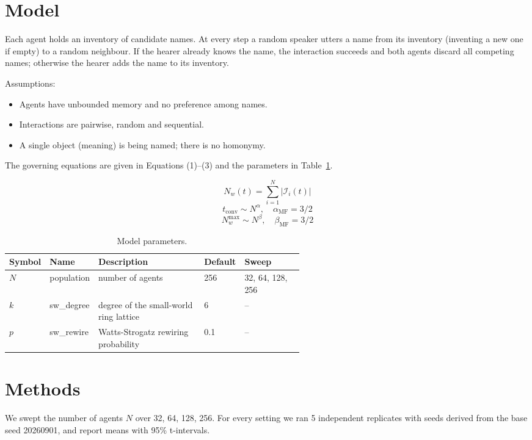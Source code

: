 \documentclass[11pt,a4paper]{article}
\begin{document}
\section{Model}
Each agent holds an inventory of candidate names. At every step a random speaker utters a name from its inventory (inventing a new one if empty) to a random neighbour. If the hearer already knows the name, the interaction succeeds and both agents discard all competing names; otherwise the hearer adds the name to its inventory.

Assumptions:
\begin{itemize}
  \item Agents have unbounded memory and no preference among names.
  \item Interactions are pairwise, random and sequential.
  \item A single object (meaning) is being named; there is no homonymy.
\end{itemize}

The governing equations are given in Equations (1)--(3) and the parameters in Table~\ref{tab:params}.

\begin{equation}\label{eq:1}
N_w(t) = \sum_{i=1}^{N} |\mathcal{I}_i(t)|
\end{equation}
\begin{equation}\label{eq:2}
t_{\mathrm{conv}} \sim N^{\alpha}, \quad \alpha_{\mathrm{MF}} = 3/2
\end{equation}
\begin{equation}\label{eq:3}
N_w^{\max} \sim N^{\beta}, \quad \beta_{\mathrm{MF}} = 3/2
\end{equation}
\begin{table}[ht]
\centering\small
\caption{Model parameters.}\label{tab:params}
\begin{tabular}{l l p{0.36\linewidth} l p{0.2\linewidth}}
\toprule
Symbol & Name & Description & Default & Sweep\\
\midrule
$N$ & population & number of agents & 256 & 32, 64, 128, 256\\
$k$ & sw\_degree & degree of the small-world ring lattice & 6 & --\\
$p$ & sw\_rewire & Watts-Strogatz rewiring probability & 0.1 & --\\
\bottomrule
\end{tabular}
\end{table}
\section{Methods}
We swept the number of agents $N$ over 32, 64, 128, 256. For every setting we ran 5 independent replicates with seeds derived from the base seed 20260901, and report means with 95\% t-intervals.
\end{document}
